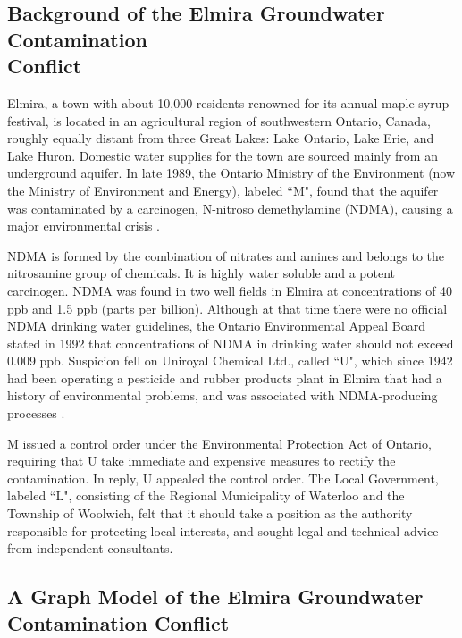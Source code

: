 \subsection{Background of the Elmira Groundwater Contamination
\\Conflict}

Elmira, a town with about 10,000 residents renowned for its annual maple syrup festival, is located in an agricultural region of southwestern Ontario, Canada, roughly equally distant from three Great Lakes: Lake Ontario, Lake Erie, and Lake Huron. Domestic water supplies for the town are sourced mainly from an underground aquifer. In late 1989, the Ontario Ministry of the Environment (now the Ministry of Environment and Energy), labeled ``M", found that the aquifer was contaminated by a carcinogen, N-nitroso demethylamine (NDMA), causing a major environmental crisis \citep{Hipel-et-al1993a, Sanderson-et-al1995, Conestoga1999}.

NDMA is formed by the combination of nitrates and amines and belongs to the nitrosamine group of chemicals. It is highly water soluble and a potent carcinogen. NDMA was found in two well fields in Elmira at concentrations of 40 ppb and 1.5 ppb (parts per billion). Although at that time there were no official NDMA drinking water guidelines, the Ontario Environmental Appeal Board stated in 1992 that concentrations of NDMA in drinking water should not exceed 0.009 ppb. Suspicion fell on Uniroyal Chemical Ltd., called ``U", which since 1942 had been operating a pesticide and rubber products plant in Elmira that had a history of environmental problems, and was associated with NDMA-producing processes \citep{Sanderson-et-al1995, Conestoga1999}.

M issued a control order under the Environmental Protection Act of Ontario, requiring that U take immediate and expensive measures to rectify the contamination. In reply, U appealed the control order. The Local Government, labeled ``L", consisting of the Regional Municipality of Waterloo and the Township of Woolwich, felt that it should take a position as the authority responsible for protecting local interests, and sought legal and technical advice from independent consultants.

\subsection{A Graph Model of the Elmira Groundwater Contamination Conflict}\label{subsec-elmira-model}

